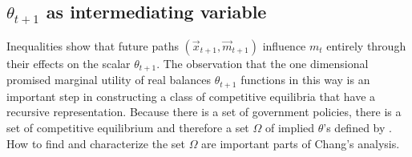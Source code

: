 \subsection{$\theta_{t+1}$ as intermediating variable}
Inequalities   show  that
future paths
$(\vec x_{t+1}, \vec m_{t+1})$   influence $m_t$ entirely through their effects on the scalar $\theta_{t+1}$. The observation that the one dimensional
promised marginal utility of real balances  $\theta_{t+1}$ functions in this way is an important step in constructing a class of competitive equilibria that have a recursive
 representation.
 Because there is a set of government policies, there is a set of competitive equilibrium
and therefore a set $\Omega$ of implied $\theta$'s defined by . How to find and characterize the set $\Omega$  are important parts of Chang's  analysis.


